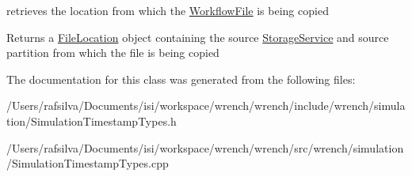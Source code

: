 retrieves the location from which the \hyperlink{classwrench_1_1_workflow_file}{Workflow\+File} is being copied 

\begin{DoxyReturn}{Returns}
a \hyperlink{structwrench_1_1_simulation_timestamp_file_copy_1_1_file_location}{File\+Location} object containing the source \hyperlink{classwrench_1_1_storage_service}{Storage\+Service} and source partition from which the file is being copied 
\end{DoxyReturn}


The documentation for this class was generated from the following files\+:\begin{DoxyCompactItemize}
\item 
/\+Users/rafsilva/\+Documents/isi/workspace/wrench/wrench/include/wrench/simulation/Simulation\+Timestamp\+Types.\+h\item 
/\+Users/rafsilva/\+Documents/isi/workspace/wrench/wrench/src/wrench/simulation/Simulation\+Timestamp\+Types.\+cpp\end{DoxyCompactItemize}

